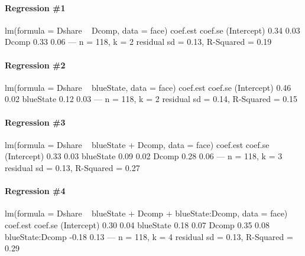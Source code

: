 \documentclass[addpoints,12pt]{exam}
\begin{document}
\begin{questions}
\begin{parts}
\end{parts}





\newpage
\footnotesize
\paragraph{\footnotesize Regression \#1}
\begin{boxedverbatim}
lm(formula = Dshare ~ Dcomp, data = face)
            coef.est coef.se
(Intercept) 0.34     0.03
Dcomp       0.33     0.06
---
n = 118, k = 2
residual sd = 0.13, R-Squared = 0.19
\end{boxedverbatim}
\vspace{-1em}

\paragraph{\footnotesize Regression \#2}
\begin{boxedverbatim}
lm(formula = Dshare ~ blueState, data = face)
            coef.est coef.se
(Intercept) 0.46     0.02
blueState   0.12     0.03
---
n = 118, k = 2
residual sd = 0.14, R-Squared = 0.15
\end{boxedverbatim}
\vspace{-1em}

\paragraph{\footnotesize Regression \#3}
\begin{boxedverbatim}
lm(formula = Dshare ~ blueState + Dcomp, data = face)
            coef.est coef.se
(Intercept) 0.33     0.03
blueState   0.09     0.02
Dcomp       0.28     0.06
---
n = 118, k = 3
residual sd = 0.13, R-Squared = 0.27
\end{boxedverbatim}
\vspace{-1em}

\paragraph{\footnotesize Regression \#4}
\begin{boxedverbatim}
lm(formula = Dshare ~ blueState + Dcomp + blueState:Dcomp, data = face)
                coef.est coef.se
(Intercept)      0.30     0.04
blueState        0.18     0.07
Dcomp            0.35     0.08
blueState:Dcomp -0.18     0.13
---
n = 118, k = 4
residual sd = 0.13, R-Squared = 0.29
\end{boxedverbatim}


\end{questions}
\end{document}
